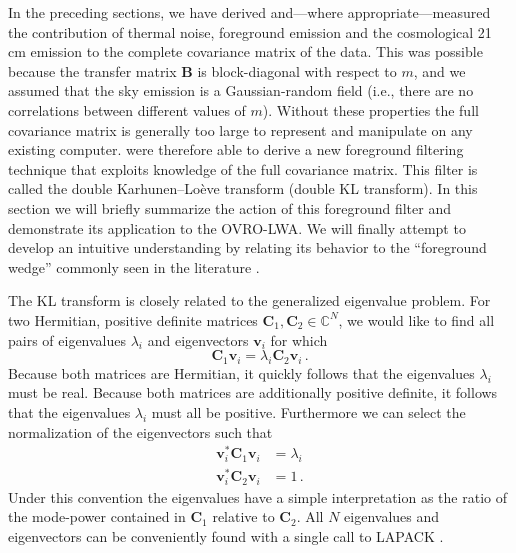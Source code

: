 \documentclass[twocolumn]{aastex62}
\renewcommand{\b}{\pmb}
\begin{document}
In the preceding sections, we have derived and---where appropriate---measured the contribution of
thermal noise, foreground emission and the cosmological 21\,cm emission to the complete covariance
matrix of the data. This was possible because the transfer matrix $\b B$ is block-diagonal with
respect to $m$, and we assumed that the sky emission is a Gaussian-random field (i.e., there are no
correlations between different values of $m$). Without these properties the full covariance matrix
is generally too large to represent and manipulate on any existing computer.
\citet{2014ApJ...781...57S, 2015PhRvD..91h3514S} were therefore able to derive a new foreground
filtering technique that exploits knowledge of the full covariance matrix. This filter is called the
double Karhunen--Lo\`{e}ve transform (double KL transform). In this section we will briefly
summarize the action of this foreground filter and demonstrate its application to the OVRO-LWA. We
will finally attempt to develop an intuitive understanding by relating its behavior to the
``foreground wedge'' commonly seen in the literature
\citep[e.g.,][]{2012ApJ...745..176V,2012ApJ...756..165P,2015ApJ...804...14T}.

The KL transform is closely related to the generalized eigenvalue problem. For two Hermitian,
positive definite matrices $\b C_1, \b C_2 \in \mathbb{C}^N$, we would like to find all pairs of
eigenvalues
$\lambda_i$ and eigenvectors $\b v_i$ for which
\begin{equation}
    \b C_1 \b v_i = \lambda_i \b C_2 \b v_i\,.
\end{equation}
Because both matrices are Hermitian, it quickly follows that the eigenvalues $\lambda_i$ must be
real. Because both matrices are additionally positive definite, it follows that the eigenvalues
$\lambda_i$ must all be positive. Furthermore we can select the normalization of the eigenvectors
such that
\begin{align}
    \b v_i^* \b C_1 \b v_i &= \lambda_i \\
    \b v_i^* \b C_2 \b v_i &= 1\,.
\end{align}
Under this convention the eigenvalues have a simple interpretation as the ratio of the mode-power
contained in $\b C_1$ relative to $\b C_2$. All $N$ eigenvalues and eigenvectors can be conveniently
found with a single call to LAPACK \citep{Anderson:1990:LPL:110382.110385}.
\end{document}
